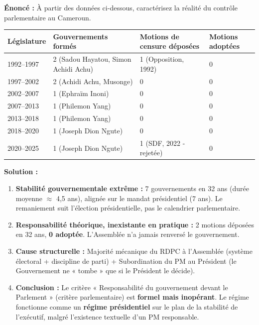 \documentclass[11pt]{article}
\begin{document}
\begin{exoresolu}
\textbf{Énoncé :} À partir des données ci-dessous, caractérisez la réalité du contrôle parlementaire au Cameroun.
\begin{center}
\begin{tabularx}{\linewidth}{|l|X|X|X|}\hline
\textbf{Législature} & \textbf{Gouvernements formés} & \textbf{Motions de censure déposées} & \textbf{Motions adoptées} \\ \hline
1992--1997 & 2 (Sadou Hayatou, Simon Achidi Achu) & 1 (Opposition, 1992) & 0 \\ \hline
1997--2002 & 2 (Achidi Achu, Musonge) & 0 & 0 \\ \hline
2002--2007 & 1 (Ephraïm Inoni) & 0 & 0 \\ \hline
2007--2013 & 1 (Philemon Yang) & 0 & 0 \\ \hline
2013--2018 & 1 (Philemon Yang) & 0 & 0 \\ \hline
2018--2020 & 1 (Joseph Dion Ngute) & 0 & 0 \\ \hline
2020--2025 & 1 (Joseph Dion Ngute) & 1 (SDF, 2022 - rejetée) & 0 \\ \hline
\end{tabularx}
\end{center}
\tcblower
\textbf{Solution :}
\begin{enumerate}
    \item \textbf{Stabilité gouvernementale extrême :} 7 gouvernements en 32 ans (durée moyenne $\approx$ 4,5 ans), alignée sur le mandat présidentiel (7 ans). Le remaniement suit l'élection présidentielle, pas le calendrier parlementaire.
    \item \textbf{Responsabilité théorique, inexistante en pratique :} 2 motions déposées en 32 ans, \textbf{0 adoptée}. L'Assemblée n'a jamais renversé le gouvernement.
    \item \textbf{Cause structurelle :} Majorité mécanique du RDPC à l'Assemblée (système électoral + discipline de parti) + Subordination du PM au Président (le Gouvernement ne « tombe » que si le Président le décide).
    \item \textbf{Conclusion :} Le critère « Responsabilité du gouvernement devant le Parlement » (critère parlementaire) est \textbf{formel mais inopérant}. Le régime fonctionne comme un \textbf{régime présidentiel} sur le plan de la stabilité de l'exécutif, malgré l'existence textuelle d'un PM responsable.
\end{enumerate}
\end{exoresolu}
\end{document}
